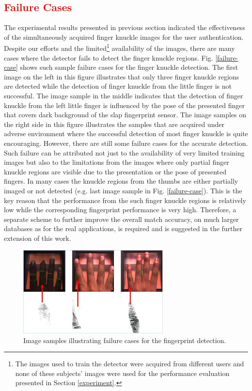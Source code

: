 \textcolor{red}{\subsection{Failure Cases}}
The experimental results presented in previous section indicated the effectiveness of the simultaneously acquired finger knuckle images for the user authentication. Despite our efforts and the limited\footnote[2]{The images used to train the detector were acquired from different users and none of these subjects’ images were used for the performance evaluation presented in Section \ref{experiment}.}  availability of the images, there are many cases where the detector fails to detect the finger knuckle regions. Fig. \ref{failure-case} shows such sample failure cases for the finger knuckle detection. The first image on the left in this figure illustrates that only three finger knuckle regions are detected while the detection of finger knuckle from the little finger is not successful. The image sample in the middle indicates that the detection of finger knuckle from the left little finger is influenced by the pose of the presented finger that covers dark background of the slap fingerprint sensor. The image samples on the right side in this figure illustrates the samples that are acquired under adverse environment where the successful detection of most finger knuckle is quite encouraging. However, there are still some failure cases for the accurate detection. Such failure can be attributed not just to the availability of very limited training images but also to the limitations from the images where only partial finger knuckle regions are visible due to the presentation or the pose of presented fingers.  In many cases the knuckle regions from the thumbs are either partially imaged or not detected (e.g. last image sample in Fig. \ref{failure-case}). This is the key reason that the performance from the such finger knuckle regions is relatively low while the corresponding fingerprint performance is very high. Therefore, a separate scheme to further improve the overall match accuracy, on much larger databases as for the real applications, is required and is suggested in the further extension of this work.  

\begin{figure}
    \begin{center}
        \includegraphics[width=3in]{Figures/failure-fingerprint.png}
    \end{center}
    \caption{Image samples illustrating failure cases for the fingerprint detection.}
    \label{failure-fingerprint}
\end{figure}

